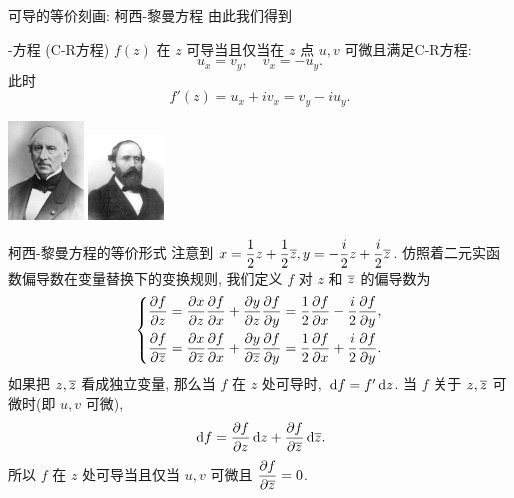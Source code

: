 \begin{frame}{可导的等价刻画: 柯西-黎曼方程}
	\onslide<+->
	由此我们得到
	\onslide<+->
	\begin{alertblock}{-方程 (C-R方程)}
		$f(z)$ 在 $z$ 可导当且仅当在 $z$ 点 $u,v$ 可微且满足C-R方程:
		\[u_x=v_y,\quad v_x=-u_y.\]
		此时
		\[f'(z)=u_x+iv_x=v_y-iu_y.\]
	\end{alertblock}

	\onslide<+->
	\begin{center}
		\includegraphics[width=2cm]{../image/Cauchy.jpeg}
		\hspace{2cm}
		\includegraphics[width=2cm]{../image/Riemann.jpeg}
	\end{center}
\end{frame}


\begin{frame}{柯西-黎曼方程的等价形式\noexer}
	\onslide<+->
	注意到 $x=\dfrac12z+\dfrac12\overline z,y=-\dfrac i2z+\dfrac i2\overline z$.
	\onslide<+->
	仿照着二元实函数偏导数在变量替换下的变换规则, 我们定义 $f$ 对 $z$ 和 $\overline z$ 的偏导数为
	\[\left\{
	\begin{aligned}
		\frac{\partial f}{\partial z}&
	=\frac{\partial x}{\partial z}\frac{\partial f}{\partial x}
		+\frac{\partial y}{\partial z}\frac{\partial f}{\partial y}
	=\frac12\frac{\partial f}{\partial x}-\frac i2\frac{\partial f}{\partial y},\\
		\frac{\partial f}{\partial \overline z}&
	=\frac{\partial x}{\partial \overline z}\frac{\partial f}{\partial x}
		+\frac{\partial y}{\partial \overline z}\frac{\partial f}{\partial y}
	=\frac12\frac{\partial f}{\partial x}+\frac i2\frac{\partial f}{\partial y}.
	\end{aligned}\right.\]
	\onslide<+->
	如果把 $z,\overline z$ 看成独立变量, 那么当 $f$ 在 $z$ 处可导时,
	$\,\mathrm{d} f=f'\,\mathrm{d} z$.
	当 $f$ 关于 $z,\overline z$ 可微时(即 $u,v$ 可微),
	\[\,\mathrm{d} f=\frac{\partial f}{\partial z}\,\mathrm{d} z+\frac{\partial f}{\partial \overline z}\,\mathrm{d}\overline z.\]
	\onslide<+->
	所以 \alert{$f$ 在 $z$ 处可导当且仅当 $u,v$ 可微且 $\dfrac{\partial f}{\partial \overline z}=0$.}
\end{frame}


